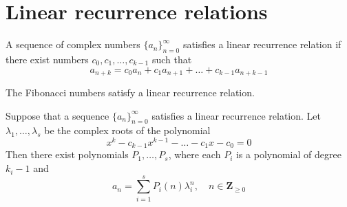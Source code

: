 
\section{Linear recurrence relations}

\begin{definition}
A sequence of complex numbers $\{ a_{n} \}_{n=0}^{\infty}$ satisfies a linear recurrence relation if there exist numbers $c_{0},c_{1},\dots,c_{k-1}$ such that
$$
a_{n+k}=c_{0}a_{n}+c_{1}a_{n+1}+\dots +c_{k-1}a_{n+k-1}
$$
\end{definition}
\begin{example}
The Fibonacci numbers satisfy a linear recurrence relation.
\end{example}
\begin{theorem}
Suppose that a sequence $\{ a_{n} \}_{n=0}^{\infty}$ satisfies a linear recurrence relation. Let $\lambda_{1},\dots,\lambda _{s}$ be the complex roots of the polynomial
$$
x^{k}-c_{k-1}x^{k-1}-\dots-c_{1}x-c_{0}=0
$$
Then there exist polynomials $P_{1},\dots,P_{s}$, where each $P_{i}$ is a polynomial of degree $k_{i}-1$ and 
$$
a_{n}=\sum_{i=1}^{s} P_{i}(n)\lambda _{i}^{n}, \quad n\in \mathbf{Z}_{\ge 0}
$$
\end{theorem}
